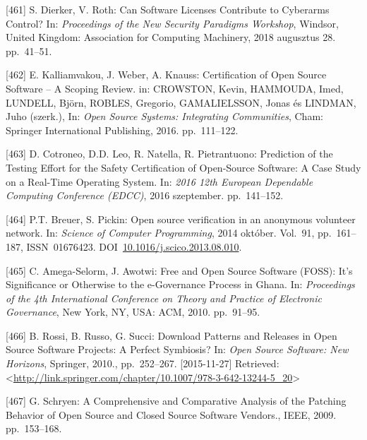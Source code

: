 \documentclass[12pt,magyar,a4paper,oneside]{scrreprt}
\newenvironment{cslreferences}%
  {}%
  {\par}
\begin{document}
\begin{cslreferences}
\leavevmode\hypertarget{ref-dierker_can_2018}{}%
{[}461{]} S. Dierker, V. Roth: Can Software Licenses Contribute to
Cyberarms Control? In: \emph{Proceedings of the New Security Paradigms
Workshop}, Windsor, United Kingdom: Association for Computing Machinery,
2018 augusztus 28. pp.~41--51.

\leavevmode\hypertarget{ref-kalliamvakou_certification_2016}{}%
{[}462{]} E. Kalliamvakou, J. Weber, A. Knauss: Certification of Open
Source Software -- A Scoping Review. in: CROWSTON, Kevin, HAMMOUDA,
Imed, LUNDELL, Björn, ROBLES, Gregorio, GAMALIELSSON, Jonas és LINDMAN,
Juho (szerk.), In: \emph{Open Source Systems: Integrating Communities},
Cham: Springer International Publishing, 2016. pp.~111--122.

\leavevmode\hypertarget{ref-cotroneo_prediction_2016}{}%
{[}463{]} D. Cotroneo, D.D. Leo, R. Natella, R. Pietrantuono: Prediction
of the Testing Effort for the Safety Certification of Open-Source
Software: A Case Study on a Real-Time Operating System. In: \emph{2016
12th European Dependable Computing Conference (EDCC)}, 2016 szeptember.
pp.~141--152.

\leavevmode\hypertarget{ref-breuer_open_2014}{}%
{[}464{]} P.T. Breuer, S. Pickin: Open source verification in an
anonymous volunteer network. In: \emph{Science of Computer Programming},
2014 október. Vol.~91, pp.~161--187, ISSN~01676423.
DOI~\href{https://doi.org/10.1016/j.scico.2013.08.010}{10.1016/j.scico.2013.08.010}.

\leavevmode\hypertarget{ref-amega-selorm_free_2010}{}%
{[}465{]} C. Amega-Selorm, J. Awotwi: Free and Open Source Software
(FOSS): It's Significance or Otherwise to the e-Governance Process in
Ghana. In: \emph{Proceedings of the 4th International Conference on
Theory and Practice of Electronic Governance}, New York, NY, USA: ACM,
2010. pp.~91--95.

\leavevmode\hypertarget{ref-rossi_download_2010}{}%
{[}466{]} B. Rossi, B. Russo, G. Succi: Download Patterns and Releases
in Open Source Software Projects: A Perfect Symbiosis? In: \emph{Open
Source Software: New Horizons}, Springer, 2010., pp.~252--267.
{[}2015-11-27{]} Retrieved:
\textless{}\url{http://link.springer.com/chapter/10.1007/978-3-642-13244-5_20}\textgreater{}

\leavevmode\hypertarget{ref-schryen_comprehensive_2009}{}%
{[}467{]} G. Schryen: A Comprehensive and Comparative Analysis of the
Patching Behavior of Open Source and Closed Source Software Vendors.,
IEEE, 2009. pp.~153--168.


\end{cslreferences}
\end{document}
